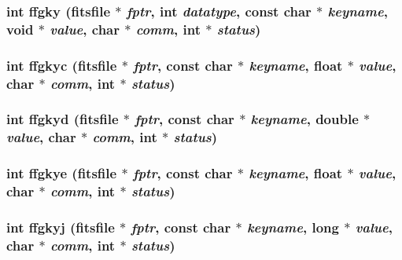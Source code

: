 \subsubsection{\setlength{\rightskip}{0pt plus 5cm}int ffgky (\bf{fitsfile} $\ast$ {\em fptr}, int {\em datatype}, const char $\ast$ {\em keyname}, void $\ast$ {\em value}, char $\ast$ {\em comm}, int $\ast$ {\em status})}\label{src_2fitsio_8h_1432368d15be90a252a794df7f9ad09c}


\subsubsection{\setlength{\rightskip}{0pt plus 5cm}int ffgkyc (\bf{fitsfile} $\ast$ {\em fptr}, const char $\ast$ {\em keyname}, float $\ast$ {\em value}, char $\ast$ {\em comm}, int $\ast$ {\em status})}\label{src_2fitsio_8h_647528834240eb725de251c7cec34850}


\subsubsection{\setlength{\rightskip}{0pt plus 5cm}int ffgkyd (\bf{fitsfile} $\ast$ {\em fptr}, const char $\ast$ {\em keyname}, double $\ast$ {\em value}, char $\ast$ {\em comm}, int $\ast$ {\em status})}\label{src_2fitsio_8h_7f11b595f4dd81df24a8e0f95198e9d0}


\subsubsection{\setlength{\rightskip}{0pt plus 5cm}int ffgkye (\bf{fitsfile} $\ast$ {\em fptr}, const char $\ast$ {\em keyname}, float $\ast$ {\em value}, char $\ast$ {\em comm}, int $\ast$ {\em status})}\label{src_2fitsio_8h_765b39f911a7fa630490fcc7c22b7da7}


\subsubsection{\setlength{\rightskip}{0pt plus 5cm}int ffgkyj (\bf{fitsfile} $\ast$ {\em fptr}, const char $\ast$ {\em keyname}, long $\ast$ {\em value}, char $\ast$ {\em comm}, int $\ast$ {\em status})}\label{src_2fitsio_8h_390adabb4fae20ebb831ef865b10cab7}



